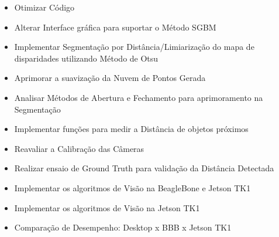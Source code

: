 \begin{itemize}
	\item Otimizar Código
	\item Alterar Interface gráfica para suportar o Método SGBM
	\item Implementar Segmentação por Distância/Limiarização do mapa de disparidades utilizando Método de Otsu
	\item Aprimorar a suavização da Nuvem de Pontos Gerada
	\item Analisar Métodos de Abertura e Fechamento para aprimoramento na Segmentação
	\item Implementar funções para medir a Distância de objetos próximos
	\item Reavaliar a Calibração das Câmeras	
	\item Realizar ensaio de Ground Truth para validação da Distância Detectada
	\item Implementar os algoritmos de Visão na BeagleBone e Jetson TK1
	\item Implementar os algoritmos de Visão na Jetson TK1
	\item Comparação de Desempenho: Desktop x BBB x Jetson TK1
\end{itemize}




